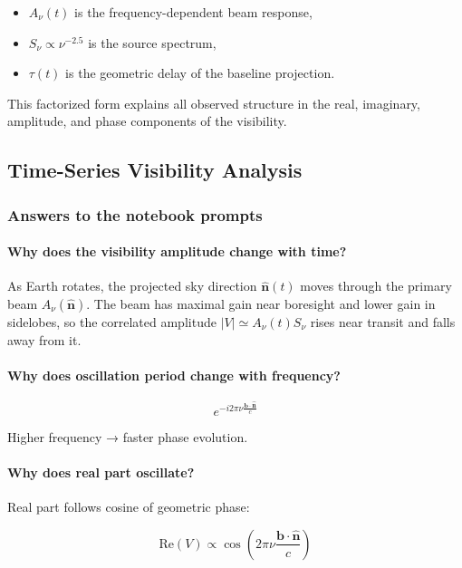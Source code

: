 \documentclass{article}
\begin{document}
\begin{itemize}
    \item $A_\nu(t)$ is the frequency-dependent beam response,
    \item $S_\nu \propto \nu^{-2.5}$ is the source spectrum,
    \item $\tau(t)$ is the geometric delay of the baseline projection.
\end{itemize}

This factorized form explains all observed structure in the real, imaginary, amplitude, and phase components of the visibility.
\subsection{Time-Series Visibility Analysis}
\subsubsection{Answers to the notebook prompts}

\paragraph{Why does the visibility amplitude change with time?} As Earth rotates, the projected sky direction $\hat{\mathbf{n}}(t)$ moves through the primary beam $A_\nu(\hat{\mathbf{n}})$. The beam has maximal gain near boresight and lower gain in sidelobes, so the correlated amplitude $|V| \simeq A_\nu(t) S_\nu$ rises near transit and falls away from it.


\paragraph{Why does oscillation period change with frequency?}

\[
e^{-i2\pi \nu \frac{\mathbf{b}\cdot \hat{\mathbf{n}}}{c}}
\]

Higher frequency → faster phase evolution.

\vspace{1em}

\paragraph{Why does real part oscillate?}

Real part follows cosine of geometric phase:

\[
\mathrm{Re}(V) \propto \cos\left(2\pi \nu \frac{\mathbf{b}\cdot \hat{\mathbf{n}}}{c}\right)
\]
\end{document}
